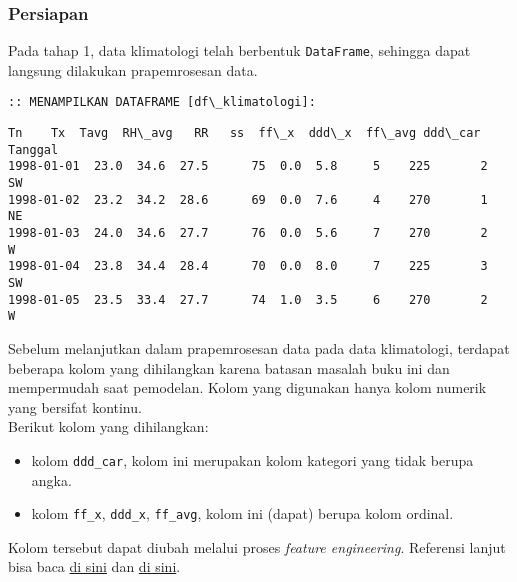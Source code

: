 \documentclass[11pt]{article}
\makeatletter
\providecommand{\tightlist}{%
      \setlength{\itemsep}{0pt}\setlength{\parskip}{0pt}}
\newcommand{\boxspacing}{\kern\kvtcb@left@rule\kern\kvtcb@boxsep}
\newcommand{\prompt}[4]{
        \ttfamily\llap{{\color{#2}[#3]:\hspace{3pt}#4}}\vspace{-\baselineskip}
    }
\makeatother
\begin{document}
    \hypertarget{persiapan}{%
\subsubsection{Persiapan}\label{persiapan}}

Pada tahap 1, data klimatologi telah berbentuk \texttt{DataFrame},
sehingga dapat langsung dilakukan prapemrosesan data.

    \begin{Verbatim}[commandchars=\\\{\}]
:: MENAMPILKAN DATAFRAME [df\_klimatologi]:
    \end{Verbatim}

            \begin{tcolorbox}[breakable, size=fbox, boxrule=.5pt, pad at break*=1mm, opacityfill=0]
\prompt{Out}{outcolor}{27}{\boxspacing}
\begin{Verbatim}[commandchars=\\\{\}]
              Tn    Tx  Tavg  RH\_avg   RR   ss  ff\_x  ddd\_x  ff\_avg ddd\_car
Tanggal
1998-01-01  23.0  34.6  27.5      75  0.0  5.8     5    225       2      SW
1998-01-02  23.2  34.2  28.6      69  0.0  7.6     4    270       1      NE
1998-01-03  24.0  34.6  27.7      76  0.0  5.6     7    270       2      W
1998-01-04  23.8  34.4  28.4      70  0.0  8.0     7    225       3      SW
1998-01-05  23.5  33.4  27.7      74  1.0  3.5     6    270       2      W
\end{Verbatim}
\end{tcolorbox}
        
    Sebelum melanjutkan dalam prapemrosesan data pada data klimatologi,
terdapat beberapa kolom yang dihilangkan karena batasan masalah buku ini
dan mempermudah saat pemodelan. Kolom yang digunakan hanya kolom numerik
yang bersifat kontinu.\\
Berikut kolom yang dihilangkan:

\begin{itemize}
\tightlist
\item
  kolom \texttt{ddd\_car}, kolom ini merupakan kolom kategori yang tidak
  berupa angka.
\item
  kolom \texttt{ff\_x}, \texttt{ddd\_x}, \texttt{ff\_avg}, kolom ini
  (dapat) berupa kolom ordinal.
\end{itemize}

Kolom tersebut dapat diubah melalui proses \emph{feature engineering}.
Referensi lanjut bisa baca
\href{https://towardsdatascience.com/smarter-ways-to-encode-categorical-data-for-machine-learning-part-1-of-3-6dca2f71b159}{di
sini} dan
\href{https://towardsdatascience.com/basic-feature-engineering-to-reach-more-efficient-machine-learning-6294022e17a5}{di
sini}.
\end{document}
